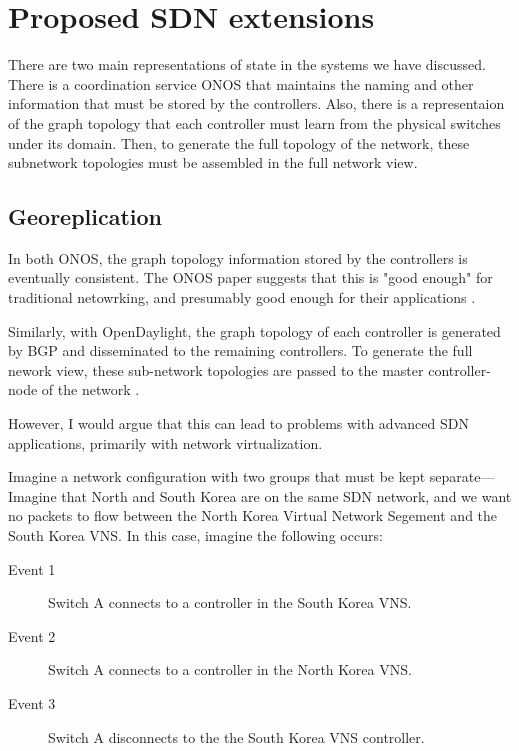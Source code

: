 \documentclass[letterpaper,twocolumn,10pt]{article}
\begin{document}


\section{Proposed SDN extensions}

There are two main representations of state in the systems we have discussed. There is a coordination service ONOS that maintains the naming and other information that must be stored by the controllers. Also, there is a representaion of the graph topology that each controller must learn from the physical switches under its domain. Then, to generate the full topology of the network, these subnetwork topologies must be assembled in the full network view.

\subsection{Georeplication}

In both ONOS, the graph topology information stored by the controllers is eventually consistent. The ONOS paper suggests that this is "good enough" for traditional netowrking, and presumably good enough for their applications \cite{ONOS}. 

Similarly, with OpenDaylight, the graph topology of each controller is generated by BGP and disseminated to the remaining controllers. To generate the full nework view, these sub-network topologies are passed to the master controller-node of the network \cite{ONV:wiki}.

However, I would argue that this can lead to problems with advanced SDN applications, primarily with network virtualization.

Imagine a network configuration with two groups that must be kept separate---Imagine that North and South Korea are on the same SDN network, and we want no packets to flow between the North Korea Virtual Network Segement and the South Korea VNS. In this case, imagine the following occurs:

\begin{description}
\item [Event 1] Switch A connects to a controller in the South Korea VNS.
\item [Event 2] Switch A connects to a controller in the North Korea VNS.
\item [Event 3] Switch A disconnects to the the South Korea VNS controller.
\end{description}
\end{document}
